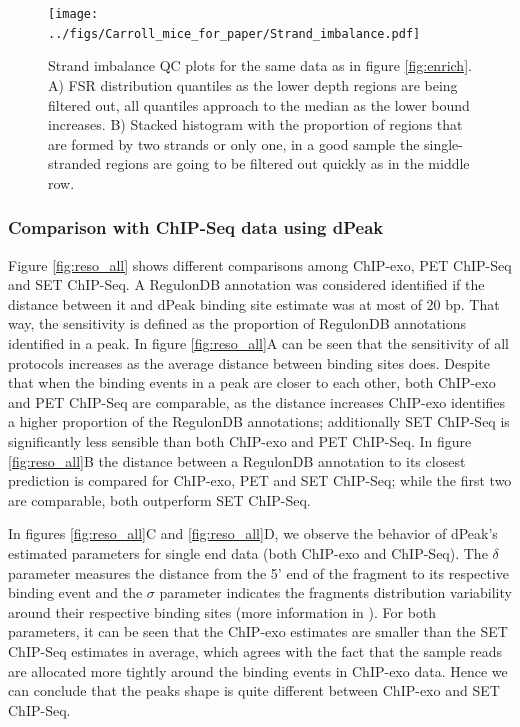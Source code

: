 \documentclass[11pt]{article}\usepackage[]{graphicx}\usepackage[]{color}
\begin{document}
\begin{figure}[H]
  \centering  
  \texttt{[image: ../figs/Carroll\_mice\_for\_paper/Strand\_imbalance.pdf]} 
  \caption{Strand imbalance QC plots for the same data as in figure
    \ref{fig:enrich}. A) FSR distribution quantiles as the lower depth
    regions are being filtered out, all quantiles approach to the
    median as the lower bound increases. B) Stacked histogram with the
    proportion of regions that are formed by two strands or only one,
    in a good sample the single-stranded regions are going to be
    filtered out quickly as in the middle row.}
  \label{fig:strand}
\end{figure}

\subsubsection{Comparison with ChIP-Seq data using dPeak}
\label{sec:dpeak_analysis}




Figure \ref{fig:reso_all} shows different comparisons among ChIP-exo,
PET ChIP-Seq and SET ChIP-Seq. A RegulonDB annotation was considered
identified if the distance between it and dPeak binding site estimate
was at most of 20 bp. That way, the sensitivity is defined as
the proportion of RegulonDB annotations identified in a peak. In
figure \ref{fig:reso_all}A can be seen that the sensitivity of all
protocols increases as the average distance between binding sites
does. Despite that when the binding events in a peak are closer to
each other, both ChIP-exo and PET ChIP-Seq are comparable, as the
distance increases ChIP-exo identifies a higher proportion of the
RegulonDB annotations; additionally SET ChIP-Seq is significantly less
sensible than both ChIP-exo and PET ChIP-Seq. In figure
\ref{fig:reso_all}B the distance between a RegulonDB annotation to its
closest prediction is compared for ChIP-exo, PET and SET ChIP-Seq;
while the first two are comparable, both outperform SET ChIP-Seq.

In figures \ref{fig:reso_all}C and \ref{fig:reso_all}D, we observe the
behavior of dPeak's estimated parameters for single end data (both
ChIP-exo and ChIP-Seq). The $\delta$ parameter measures the distance
from the 5' end of the fragment to its respective binding event and
the $\sigma$ parameter indicates the fragments distribution
variability around their respective binding sites (more information in
\cite{dpeak}). For both parameters, it can be seen that the ChIP-exo
estimates are smaller than the SET ChIP-Seq estimates in average,
which agrees with the fact that the sample reads are allocated more
tightly around the binding events in ChIP-exo data. Hence we can
conclude that the peaks shape is quite different between ChIP-exo and
SET ChIP-Seq.
\end{document}

